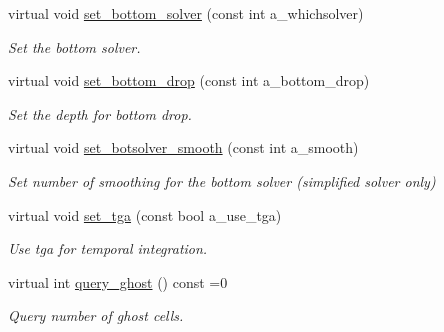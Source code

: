 \begin{DoxyCompactItemize}
virtual void \hyperlink{classcdr__tga_ab1cdae011c0cb5c87468de7ecc47afdf}{set\+\_\+bottom\+\_\+solver} (const int a\+\_\+whichsolver)
\begin{DoxyCompactList}\small\item\em Set the bottom solver. \end{DoxyCompactList}\item 
virtual void \hyperlink{classcdr__tga_a8344d56aeca64fc78abb7045cac44619}{set\+\_\+bottom\+\_\+drop} (const int a\+\_\+bottom\+\_\+drop)
\begin{DoxyCompactList}\small\item\em Set the depth for bottom drop. \end{DoxyCompactList}\item 
virtual void \hyperlink{classcdr__tga_a3b440271199a18ad25c6c2cb816808b4}{set\+\_\+botsolver\+\_\+smooth} (const int a\+\_\+smooth)
\begin{DoxyCompactList}\small\item\em Set number of smoothing for the bottom solver (simplified solver only) \end{DoxyCompactList}\item 
virtual void \hyperlink{classcdr__tga_a7208f9586b3864a1d2f51dd4f84debaf}{set\+\_\+tga} (const bool a\+\_\+use\+\_\+tga)
\begin{DoxyCompactList}\small\item\em Use tga for temporal integration. \end{DoxyCompactList}\item 
virtual int \hyperlink{classcdr__tga_a8d72b769ddebc086e3a69518673fc6c4}{query\+\_\+ghost} () const =0
\begin{DoxyCompactList}\small\item\em Query number of ghost cells. \end{DoxyCompactList}\end{DoxyCompactItemize}
